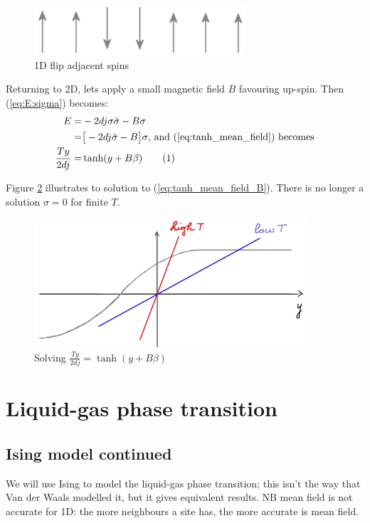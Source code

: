 \documentclass[]{article}
\newcommand\numberthis{\addtocounter{equation}{1}\tag{\theequation}}
\begin{document}
\begin{figure}[H]
	\center
	\caption{1D flip adjacent spins}\label{fig:1D:flip_adjacent}
	\includegraphics[width=0.7\textwidth]{T_zero_aligned_flip}
\end{figure}

Returning to 2D, lets apply a small magnetic field $B$ favouring up-spin. Then (\ref{eq:E:sigma}) becomes:
\begin{align*}
	E =& -2 d j \sigma \bar{\sigma} - B\sigma\\
	=& 	\big[-2 d j  \bar{\sigma} - B\big] \sigma \text{, and (\ref{eq:tanh_mean_field}) becomes}\\
	\frac{T y}{2 d j} =& \tanh(y +B\beta)\numberthis\label{eq:tanh_mean_field_B}
\end{align*}

Figure \ref{fig:tanh_mean_field_B} illustrates to solution to (\ref{eq:tanh_mean_field_B}). There is no longer a solution $\sigma=0$ for finite $T$.
\begin{figure}[H]
	\caption{Solving $\frac{T y}{2 d j} = \tanh(y +B\beta)$}\label{fig:tanh_mean_field_B}
	\includegraphics[width=0.9\textwidth]{tanh_mean_field_B}
\end{figure}


\section{Liquid-gas phase transition}


\subsection{Ising model continued}

We will use  Ising to model the liquid-gas phase transition; this isn't the way that Van der Waals modelled it, but it gives equivalent results. NB mean field is not accurate for 1D: the more neighbours a site has, the more accurate is mean field. 
\end{document}
